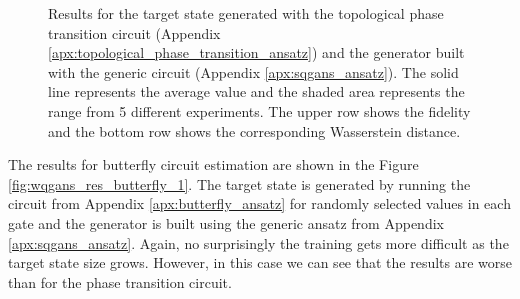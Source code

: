 \begin{figure}[htbp!]
  \caption{Results for the target state generated with the topological phase transition
    circuit (Appendix \ref{apx:topological_phase_transition_ansatz}) and
    the generator built with the generic circuit (Appendix \ref{apx:sqgans_ansatz}).
    The solid line represents the average value and the shaded area
    represents the range from 5 different experiments. The upper row shows the
    fidelity and the bottom row shows the corresponding Wasserstein distance.}
  \label{fig:wqgans_res_1}
\end{figure}


The results for butterfly circuit estimation are shown in the Figure
\ref{fig:wqgans_res_butterfly_1}. The target state is generated by running
the circuit from Appendix \ref{apx:butterfly_ansatz} for randomly selected
values in each gate and the generator is built using the generic ansatz from Appendix
\ref{apx:sqgans_ansatz}. Again, no surprisingly the training gets more difficult
as the target state size grows. However, in this case we can see that the results
are worse than for the phase transition circuit.


